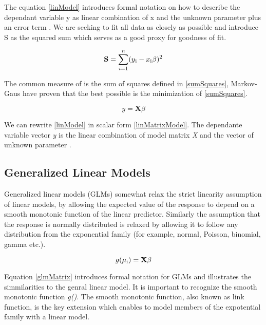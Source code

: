 \message{ !name(expose.tex)}\documentclass{article}
\begin{document}
    The equation \ref{linModel} introduces formal notation on how to describe the dependant variable y as linear combination of x and the unknown parameter \textbeta plus an error term \textepsilon. We are seeking \textbeta to fit all data as closely as possible and introduce S as the squared sum which serves as a good proxy for goodness of fit.

    \begin{equation} \label{sumSquares} \mathbf{S} =  \sum_{i=1}^{n}(y\textsubscript{i} - x\textsubscript{i}\beta)^{2} \end{equation}

    The common measure of \textbeta is the sum of squares defined in \ref{sumSquares}, Markov-Gaus have proven that the best possible \textbeta is the minimization of \ref{sumSquares}.

    \begin{equation}  \label{linMatrixModel} y =  \mathbf{X} \beta \end{equation}

    We can rewrite \ref{linModel} in scalar form \ref{linMatrixModel}. The dependante variable vector \textit{y} is the linear combination of model matrix \textit{X} and the vector of unknown parameter \textbeta.

    \subsection{Generalized Linear Models}
    Generalized linear models (GLMs) somewhat relax the strict linearity assumption of linear models, by allowing the expected value of the response to depend on a smooth monotonic function of the linear predictor. Similarly the assumption that the response is normally distributed is relaxed by allowing it to follow any distribution from the exponential family (for example, normal, Poisson, binomial, gamma etc.).

    \begin{equation} \label{glmMatrix} g(\mu\textsubscript{i}) = \mathbf{X} \beta \end{equation}

    Equation \ref{glmMatrix} introduces formal notation for GLMs and illustrates the simmilarities to the genral linear model. It is important to recognize the smooth monotonic function \textit{g()}. The smooth monotonic function, also known as link function, is the key extension which enables to model members of the expotential family with a linear model.
\end{document}
